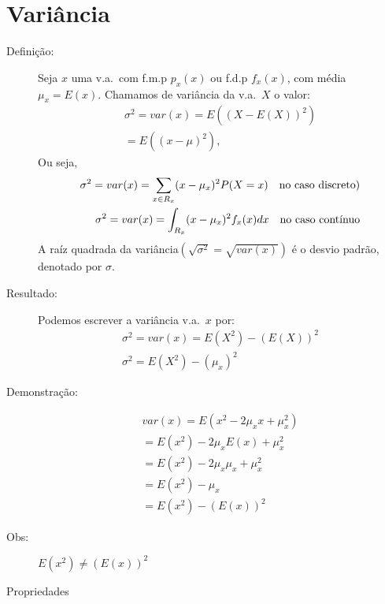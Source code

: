      \section{Variância}

     \begin{description}
       \item [Definição:] Seja $x$ uma v.a.\ com f.m.p $p_{x}(x)$ ou f.d.p $f_{x}(x)$, com 
         média $\mu_{x}=E(x)$. Chamamos de variância da v.a.\ $X$ o valor: 
         \begin{align}
           \sigma^2=var(x)=E\left(\left(X-E\left(X\right)\right)^2\right)\\
           =E \left((x-\mu)^2\right),
         \end{align}
         Ou seja,
         \begin{align}
           \sigma^2 =var(x)=\sum \limits_{x \in R_{x}} (x-\mu_{x})^2 P(X=x) \text{\quad no caso discreto)}\\
           \sigma^2 =var(x)=\int_{R_{x}} (x-\mu_{x})^2 f_{x}(x)dx \text{\quad no caso contínuo}
         \end{align}
         A raíz quadrada da variância$(\sqrt{\sigma^2}=\sqrt{var(x)})$ é o desvio padrão, 
         denotado por $\sigma$.

       \item [Resultado:] Podemos escrever a variância v.a.\ $x$ por: 
         \begin{align}
           \sigma^2 =var(x)=E(X^2)-\left(E(X)\right)^2\\
           \sigma^2 =E(X^2)-\left(\mu_x\right)^2
         \end{align}
       \item [Demonstração:] 
         \begin{align}
           var(x)=E(x^2-2\mu_{x}x+\mu_{x}^2)\\
           =E(x^2)-2\mu_{x}E(x)+\mu_{x}^2\\
           =E(x^2)-2\mu_{x}\mu_{x}+\mu_{x}^2\\
           =E(x^2)-\mu_{x}\\
           =E(x^2)-\left(E(x)\right)^2
         \end{align}
       \item [Obs:] $E(x^2) \neq \left(E(x)\right)^2$

       \item [Propriedades]


\end{description}
